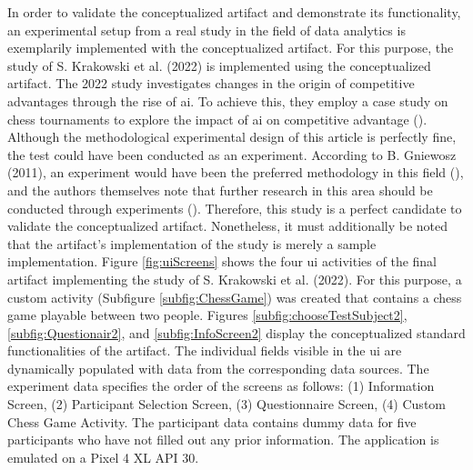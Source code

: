 In order to validate the conceptualized artifact and demonstrate its functionality, an experimental setup from a real study in the field of data analytics is exemplarily implemented with the conceptualized artifact. For this purpose, the study of S. Krakowski et al. (2022) is implemented using the conceptualized artifact. The 2022 study investigates changes in the origin of competitive advantages through the rise of \ac{ai}. To achieve this, they employ a case study on chess tournaments to explore the impact of \ac{ai} on competitive advantage (\cite{Krakowski.2022}). Although the methodological experimental design of this article is perfectly fine, the test could have been conducted as an experiment. According to B. Gniewosz (2011), an experiment would have been the preferred methodology in this field (\cite{Gniewosz.2011}), and the authors themselves note that further research in this area should be conducted through experiments (\cite{Krakowski.2022}). Therefore, this study is a perfect candidate to validate the conceptualized artifact. Nonetheless, it must additionally be noted that the artifact's implementation of the study is merely a sample implementation. Figure \ref{fig:uiScreens} shows the four \ac{ui} activities of the final artifact implementing the study of S. Krakowski et al. (2022). For this purpose, a custom activity (Subfigure \ref{subfig:ChessGame}) was created that contains a chess game playable between two people. Figures \ref{subfig:chooseTestSubject2}, \ref{subfig:Questionair2}, and \ref{subfig:InfoScreen2} display the conceptualized standard functionalities of the artifact. The individual fields visible in the \ac{ui} are dynamically populated with data from the corresponding data sources. The experiment data specifies the order of the screens as follows: (1) Information Screen, (2) Participant Selection Screen, (3) Questionnaire Screen, (4) Custom Chess Game Activity. The participant data contains dummy data for five participants who have not filled out any prior information. The application is emulated on a Pixel 4 XL API 30.

